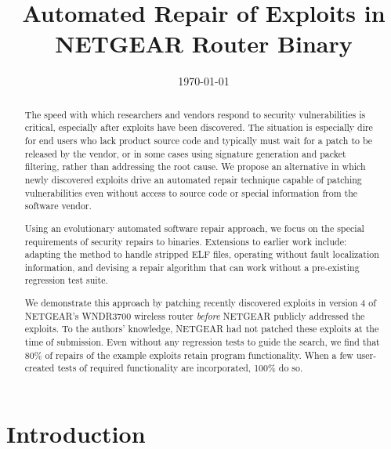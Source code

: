 \documentclass{sigcomm-alternate}
\date{\today}
\title{Automated Repair of Exploits in NETGEAR Router Binary}
\begin{document}
\maketitle
\usetikzlibrary{arrows,decorations,decorations.pathreplacing,shapes}

\begin{abstract}
The speed with which researchers and vendors respond to security
vulnerabilities is critical, especially after exploits have been discovered.
The situation is especially dire for end users who lack
product source code and typically must wait for a patch to be released
by the vendor, or in some cases using
signature generation and packet filtering, rather than addressing the
root cause. We propose an alternative in which newly discovered
exploits drive an automated repair technique capable of patching
vulnerabilities even without access to source code or special
information from the software vendor.

Using an evolutionary automated software repair approach, we focus on
the special requirements of security repairs to binaries.  Extensions
to earlier work include: adapting the method to handle stripped ELF
files, operating without fault localization information, and devising
a repair algorithm that can work without a pre-existing regression
test suite.

We demonstrate this approach by patching recently discovered exploits
in version 4 of NETGEAR's WNDR3700 wireless router \emph{before}
NETGEAR publicly addressed the exploits. To the authors' knowledge,
NETGEAR had not patched these exploits at the time of submission.
Even without any regression tests to guide the search, we find that 80\% of
repairs of the example exploits retain program functionality.
When a few user-created tests of required functionality are incorporated, 100\% do so.

\end{abstract}

\section{Introduction}
\label{sec-1}
\end{document}
